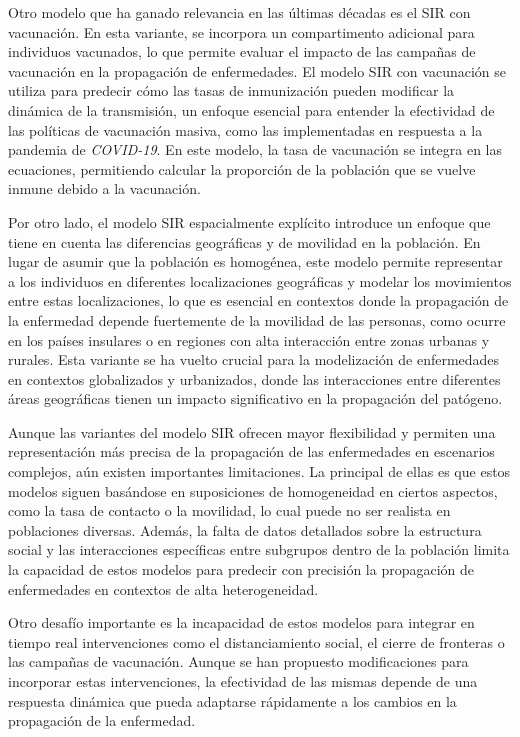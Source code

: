 Otro modelo que ha ganado relevancia en las últimas décadas es el SIR con vacunación. En esta variante, se incorpora un compartimento adicional para individuos vacunados, lo que permite evaluar el impacto de las campañas de vacunación en la propagación de enfermedades. El modelo SIR con vacunación se utiliza para predecir cómo las tasas de inmunización pueden modificar la dinámica de la transmisión, un enfoque esencial para entender la efectividad de las políticas de vacunación masiva, como las implementadas en respuesta a la pandemia de \textit{COVID-19}. En este modelo, la tasa de vacunación se integra en las ecuaciones, permitiendo calcular la proporción de la población que se vuelve inmune debido a la vacunación.

Por otro lado, el modelo SIR espacialmente explícito introduce un enfoque que tiene en cuenta las diferencias geográficas y de movilidad en la población. En lugar de asumir que la población es homogénea, este modelo permite representar a los individuos en diferentes localizaciones geográficas y modelar los movimientos entre estas localizaciones, lo que es esencial en contextos donde la propagación de la enfermedad depende fuertemente de la movilidad de las personas, como ocurre en los países insulares o en regiones con alta interacción entre zonas urbanas y rurales. Esta variante se ha vuelto crucial para la modelización de enfermedades en contextos globalizados y urbanizados, donde las interacciones entre diferentes áreas geográficas tienen un impacto significativo en la propagación del patógeno.

Aunque las variantes del modelo SIR ofrecen mayor flexibilidad y permiten una representación más precisa de la propagación de las enfermedades en escenarios complejos, aún existen importantes limitaciones. La principal de ellas es que estos modelos siguen basándose en suposiciones de homogeneidad en ciertos aspectos, como la tasa de contacto o la movilidad, lo cual puede no ser realista en poblaciones diversas. Además, la falta de datos detallados sobre la estructura social y las interacciones específicas entre subgrupos dentro de la población limita la capacidad de estos modelos para predecir con precisión la propagación de enfermedades en contextos de alta heterogeneidad.

Otro desafío importante es la incapacidad de estos modelos para integrar en tiempo real intervenciones como el distanciamiento social, el cierre de fronteras o las campañas de vacunación. Aunque se han propuesto modificaciones para incorporar estas intervenciones, la efectividad de las mismas depende de una respuesta dinámica que pueda adaptarse rápidamente a los cambios en la propagación de la enfermedad.

